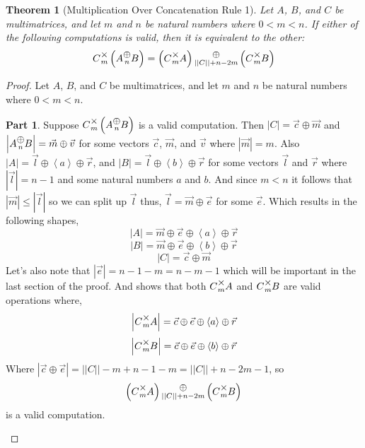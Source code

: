 \documentclass[12pt]{book}
\theoremstyle{plain}
\newtheorem{theorem}{Theorem}[chapter]
\theoremstyle{definition}
\theoremstyle{ppart}
\newtheorem{ppart}{Part}
\theoremstyle{case}
\theoremstyle{solution}
\newcommand{\mmult}[1]{\text{\raisebox{1ex}{$\underset{#1}{\times}$}}}
\newcommand{\mconcat}[1]{\text{\raisebox{1ex}{$\underset{#1}{\oplus}$}}}
\newcommand{\shape}[1]{\left|#1\right|}
\begin{document}
\begin{theorem}[Multiplication Over Concatenation Rule 1]
Let $A$, $B$, and $C$ be multimatrices, and let $m$ and $n$ be
natural numbers where $0 < m < n$. 
If either of the following computations  is valid, then it is equivalent to the other:
\[ C \mmult{m} \left(A \mconcat{n} B\right) = \left(C \mmult{m} A\right) \mconcat{\shape{\shape{C}}+n-2m} \left(C \mmult{m} B\right) \]
\end{theorem}
\begin{landscape}
\begin{proof}
Let $A$, $B$, and $C$ be multimatrices, and let $m$ and $n$ be
natural numbers where $0 < m < n$. 

\begin{ppart}
Suppose $C \mmult{m} \left(A \mconcat{n} B\right)$ is a valid computation.
Then $\shape{C} = \vec{c} \oplus \vec{m}$ and $\shape{A \mconcat{n} B} = \vec{m} \oplus \vec{v}$
for some vectors $\vec{c}$, $\vec{m}$, and $\vec{v}$ where $\shape{\vec{m}} = m$.
Also $\shape{A} = \vec{l} \oplus \left<a\right> \oplus \vec{r}$, and $\shape{B} = \vec{l} \oplus \left<b\right> \oplus \vec{r}$
for some vectors $\vec{l}$ and $\vec{r}$ where $\shape{\vec{l}} = n-1$ and some natural numbers $a$ and $b$.
And since $m < n$ it follows that $\shape{\vec{m}} \le \shape{\vec{l}}$ so we can split up $\vec{l}$ thus,
$\vec{l} = \vec{m} \oplus \vec{e}$ for some $\vec{e}$. Which results in the following shapes,
\[ \shape{A} = \vec{m} \oplus \vec{e} \oplus \left<a\right> \oplus \vec{r} \]
\[ \shape{B} = \vec{m} \oplus \vec{e} \oplus \left<b\right> \oplus \vec{r} \]
\[ \shape{C} = \vec{c} \oplus \vec{m} \]
Let's also note that $\shape{\vec{e}} = n-1-m = n-m-1$ which will be important in the last section of the proof.
And shows that both $C \mmult{m} A$ and $C \mmult{m} B$ are valid operations where,
\[ \shape{C \mmult{m} A} = \vec{c} \oplus \vec{e} \oplus \left<a\right> \oplus \vec{r} \]
\[ \shape{C \mmult{m} B} = \vec{c} \oplus \vec{e} \oplus \left<b\right> \oplus \vec{r} \]
Where $\shape{\vec{c} \oplus \vec{e}} = \shape{\shape{C}}-m + n-1-m = \shape{\shape{C}}+n-2m-1$,
so \[ \left(C \mmult{m} A\right) \mconcat{\shape{\shape{C}}+n-2m} \left(C \mmult{m} B\right) \] is a valid computation.
\end{ppart}


\end{proof}
\end{landscape}
\end{document}
